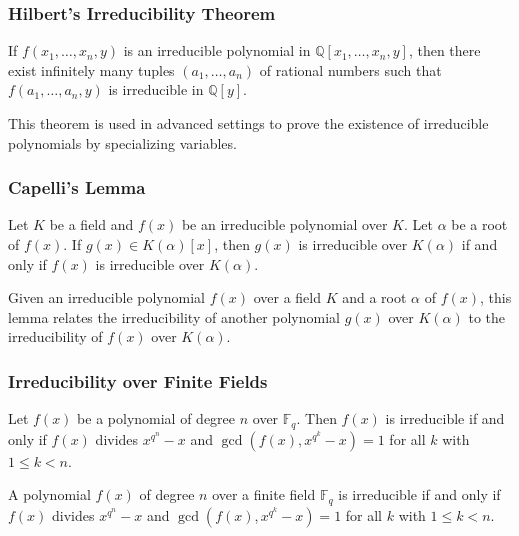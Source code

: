 \subsubsection{Hilbert's Irreducibility Theorem}

\begin{theorem}
If $f(x_1, \dots, x_n, y)$ is an irreducible polynomial in $\mathbb{Q}[x_1, \dots, x_n, y]$, then there exist infinitely many tuples $(a_1, \dots, a_n)$ of rational numbers such that $f(a_1, \dots, a_n, y)$ is irreducible in $\mathbb{Q}[y]$.
\end{theorem}
This theorem is used in advanced settings to prove the existence of irreducible polynomials by specializing variables.

\subsubsection{Capelli's Lemma}

\begin{lemma}
Let $K$ be a field and $f(x)$ be an irreducible polynomial over $K$. Let $\alpha$ be a root of $f(x)$. If $g(x) \in K(\alpha)[x]$, then $g(x)$ is irreducible over $K(\alpha)$ if and only if $f(x)$ is irreducible over $K(\alpha)$.
\end{lemma}
Given an irreducible polynomial $f(x)$ over a field $K$ and a root $\alpha$ of $f(x)$, this lemma relates the irreducibility of another polynomial $g(x)$ over $K(\alpha)$ to the irreducibility of $f(x)$ over $K(\alpha)$.

\subsubsection{Irreducibility over Finite Fields}

\begin{theorem}
Let $f(x)$ be a polynomial of degree $n$ over $\mathbb{F}_q$. Then $f(x)$ is irreducible if and only if $f(x)$ divides $x^{q^{n}}-x$ and $\gcd(f(x), x^{q^{k}}-x)=1$ for all $k$ with $1\leq k < n$.
\end{theorem}
A polynomial $f(x)$ of degree $n$ over a finite field $\mathbb{F}_q$ is irreducible if and only if $f(x)$ divides $x^{q^n} - x$ and $\gcd(f(x), x^{q^k} - x) = 1$ for all $k$ with $1 \leq k < n$.
